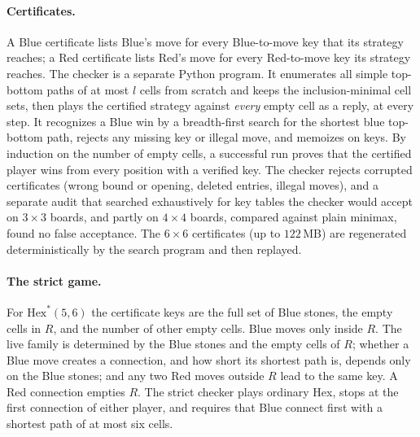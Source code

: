 \documentclass[11pt]{amsart}
\theoremstyle{definition}
\theoremstyle{remark}
\newcommand{\Hex}{\mathrm{Hex}}
\begin{document}
\paragraph{Certificates.} A Blue certificate lists Blue's move for every Blue-to-move key that its strategy reaches; a Red certificate lists Red's move for every Red-to-move key its strategy reaches. The checker is a separate Python program. It enumerates all simple top-bottom paths of at most $l$ cells from scratch and keeps the inclusion-minimal cell sets, then plays the certified strategy against \emph{every} empty cell as a reply, at every step. It recognizes a Blue win by a breadth-first search for the shortest blue top-bottom path, rejects any missing key or illegal move, and memoizes on keys. By induction on the number of empty cells, a successful run proves that the certified player wins from every position with a verified key. The checker rejects corrupted certificates (wrong bound or opening, deleted entries, illegal moves), and a separate audit that searched exhaustively for key tables the checker would accept on $3\times3$ boards, and partly on $4\times4$ boards, compared against plain minimax, found no false acceptance. The $6\times6$ certificates (up to $122$\,MB) are regenerated deterministically by the search program and then replayed.

\paragraph{The strict game.} For $\Hex^{*}(5,6)$ the certificate keys are the full set of Blue stones, the empty cells in $R$, and the number of other empty cells. Blue moves only inside $R$. The live family is determined by the Blue stones and the empty cells of $R$; whether a Blue move creates a connection, and how short its shortest path is, depends only on the Blue stones; and any two Red moves outside $R$ lead to the same key. A Red connection empties $R$. The strict checker plays ordinary Hex, stops at the first connection of either player, and requires that Blue connect first with a shortest path of at most six cells.
\end{document}

